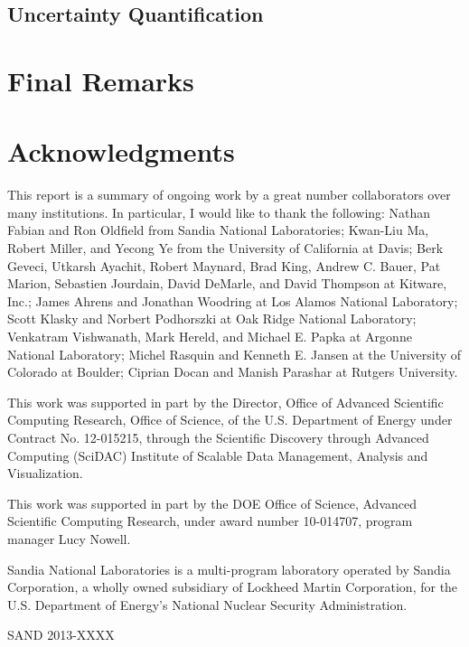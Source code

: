 \documentclass[conference]{IEEEtran}
\begin{document}
\noindent

\subsection{Uncertainty Quantification}

\noindent

\section{Final Remarks}
\label{sec:Conclusion}

\noindent

\section*{Acknowledgments}

\noindent
This report is a summary of ongoing work by a great number collaborators
over many institutions.  In particular, I would like to thank the
following: Nathan Fabian and Ron Oldfield from Sandia National
Laboratories; Kwan-Liu Ma, Robert Miller, and Yecong Ye from the University
of California at Davis; Berk Geveci, Utkarsh Ayachit, Robert Maynard, Brad
King, Andrew C. Bauer, Pat Marion, Sebastien Jourdain, David DeMarle, and
David Thompson at Kitware, Inc.; James Ahrens and Jonathan Woodring at Los
Alamos National Laboratory; Scott Klasky and Norbert Podhorszki at Oak
Ridge National Laboratory; Venkatram Vishwanath, Mark Hereld, and Michael
E. Papka at Argonne National Laboratory; Michel Rasquin and Kenneth
E. Jansen at the University of Colorado at Boulder; Ciprian Docan and
Manish Parashar at Rutgers University.


This work was supported in part by the Director, Office of Advanced
Scientific Computing Research, Office of Science, of the U.S. Department of
Energy under Contract No. 12-015215, through the Scientific Discovery
through Advanced Computing (SciDAC) Institute of Scalable Data Management,
Analysis and Visualization.

This work was supported in part by the DOE Office of Science, Advanced
Scientific Computing Research, under award number 10-014707, program
manager Lucy Nowell.

Sandia National Laboratories is a multi-program laboratory operated by
Sandia Corporation, a wholly owned subsidiary of Lockheed Martin
Corporation, for the U.S. Department of Energy's National Nuclear Security
Administration.

\noindent
{\small SAND 2013-XXXX}



\end{document}
